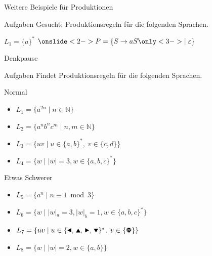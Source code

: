 \begin{frame}{Weitere Beispiele für Produktionen}
    \begin{alertblock}{Aufgaben}
    Gesucht: Produktionsregeln für die folgenden Sprachen.
    \end{alertblock}
    \begin{exampleblock}{$L_1 = \{a\}^*$}
    $\onslide<2->{P=\{S \rightarrow aS \only<3->{\mid \emptyWord}\}}$
    \end{exampleblock}
\end{frame}

{
\begin{frame}{Denkpause}
    \begin{alertblock}{Aufgaben}
    Findet Produktionsregeln für die folgenden Sprachen.
    \end{alertblock}
    \begin{block}{Normal}
    \begin{itemize}
        \item $L_1 = \{a^{2n}\;|\;n\in\mathbb{N}\}$
        \item $L_2 = \{a^nb^nc^m\;|\;n, m\in\mathbb{N}\}$
        \item $L_3 = \{uv\;|\;u\in\{a,b\}^\ast,\;v\in\{c,d\}\}$
        \item $L_4 = \{w\;|\;|w| = 3, w\in \{a,b,c\}^*\}$
    \end{itemize}
    \end{block}
    \begin{block}{Etwas Schwerer}
    \begin{itemize}
        \item $L_5 = \{a^n\;|\;n \equiv 1 \bmod 3\}$
        \item $L_6 = \{w\;|\;|w|_a = 3, |w|_b = 1, w\in \{a,b,c\}^*\}$
        \item $L_7 = \{uv\;|\;u\in\{\text{\Rewind, \MoveUp, \Forward, \MoveDown}\}^\ast,\;v\in\{\text{\Stopsign}\}\}$
        \item $L_8 = \{w\mid |w|=2, w \in \{a, b\}\}$
    \end{itemize}
    \end{block}
\end{frame}
}


